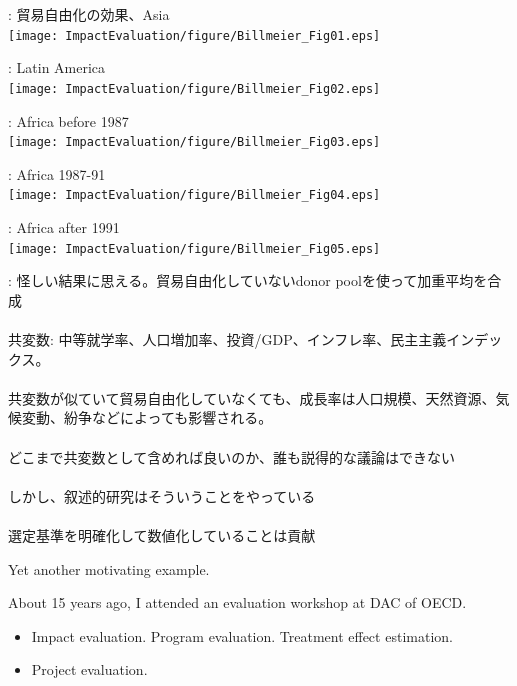 \begin{frame}{}
\citet{Billmeier2013}: 貿易自由化の効果、Asia\\
\hfil\texttt{[image: ImpactEvaluation/figure/Billmeier\_Fig01.eps]}
\end{frame}
\begin{frame}{}
\citet{Billmeier2013}: Latin America\\
\hfil\texttt{[image: ImpactEvaluation/figure/Billmeier\_Fig02.eps]}
\end{frame}
\begin{frame}{}
\citet{Billmeier2013}: Africa before 1987\\
\hfil\texttt{[image: ImpactEvaluation/figure/Billmeier\_Fig03.eps]}
\end{frame}
\begin{frame}{}
\citet{Billmeier2013}: Africa 1987-91\\
\hfil\texttt{[image: ImpactEvaluation/figure/Billmeier\_Fig04.eps]}
\end{frame}
\begin{frame}{}
\citet{Billmeier2013}: Africa after 1991\\
\hfil\texttt{[image: ImpactEvaluation/figure/Billmeier\_Fig05.eps]}
\end{frame}
\begin{frame}{}
\citet{Billmeier2013}: \pause
怪しい結果に思える。貿易自由化していないdonor poolを使って加重平均を合成\\~\\
共変数: 中等就学率、人口増加率、投資/GDP、インフレ率、民主主義インデックス。\\~\\
\pause
共変数が似ていて貿易自由化していなくても、成長率は人口規模、天然資源、気候変動、紛争などによっても影響される。\\~\\
\pause
どこまで共変数として含めれば良いのか、誰も説得的な議論はできない\\~\\
\pause
しかし、叙述的研究はそういうことをやっている\\~\\
選定基準を明確化して数値化していることは貢献
\end{frame}


\begin{frame}[label = yetanother]{}
Yet another motivating example.

\vspace{2ex}
\pause
About 15 years ago, I attended an evaluation workshop at DAC of OECD.
\pause
\begin{itemize}
\vspace{1.0ex}\setlength{\itemsep}{1.0ex}\setlength{\baselineskip}{12pt}
\item	Impact evaluation. \pause Program evaluation. Treatment effect estimation.
\pause
\item	Project evaluation.
\end{itemize}
\hfill\hyperlink{DAC5<1>}{}
\end{frame}


